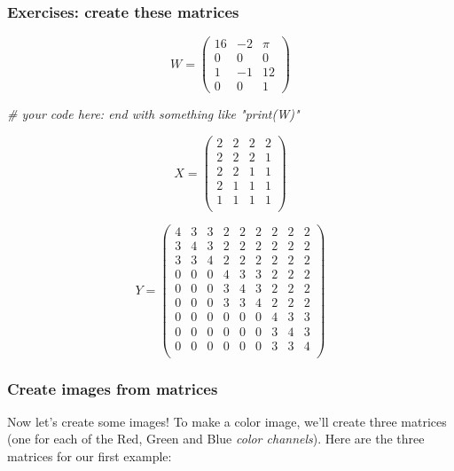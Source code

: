 \documentclass[
]{article}
\newenvironment{Shaded}{\begin{snugshade}}{\end{snugshade}}
\newcommand{\CommentTok}[1]{\textcolor[rgb]{0.56,0.35,0.01}{\textit{#1}}}
\begin{document}
\hypertarget{exercises-create-these-matrices}{%
\subsubsection{Exercises: create these
matrices}\label{exercises-create-these-matrices}}

\[
W = \begin{pmatrix}
16&-2&\pi\\0&0&0\\1&-1&12\\0&0&1
\end{pmatrix}
\]

\begin{Shaded}
\begin{Highlighting}[]
\CommentTok{\# your code here: end with something like "print(W)"}
\end{Highlighting}
\end{Shaded}

\[
X = \begin{pmatrix}
2&2&2&2\\
2&2&2&1\\
2&2&1&1\\
2&1&1&1\\
1&1&1&1\\
\end{pmatrix}
\]

\[
Y = \begin{pmatrix}
4&3&3&2&2&2&2&2&2\\
3&4&3&2&2&2&2&2&2\\
3&3&4&2&2&2&2&2&2\\
0&0&0&4&3&3&2&2&2\\
0&0&0&3&4&3&2&2&2\\
0&0&0&3&3&4&2&2&2\\
0&0&0&0&0&0&4&3&3\\
0&0&0&0&0&0&3&4&3\\
0&0&0&0&0&0&3&3&4\\
\end{pmatrix}
\]

\hypertarget{create-images-from-matrices}{%
\subsubsection{Create images from
matrices}\label{create-images-from-matrices}}

Now let's create some images! To make a color image, we'll create three
matrices (one for each of the Red, Green and Blue \emph{color
channels}). Here are the three matrices for our first example:
\end{document}
